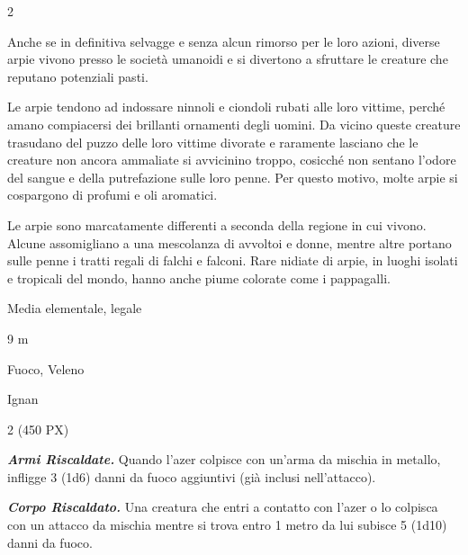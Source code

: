 \begin{multicols}{2}
{Anche se in definitiva selvagge e senza alcun rimorso per le loro azioni, diverse arpie vivono presso le società umanoidi e si divertono a sfruttare le creature che reputano potenziali pasti.

Le arpie tendono ad indossare ninnoli e ciondoli rubati alle loro vittime, perché amano compiacersi dei brillanti ornamenti degli uomini. Da vicino queste creature trasudano del puzzo delle loro vittime divorate e raramente lasciano che le creature non ancora ammaliate si avvicinino troppo, cosicché non sentano l'odore del sangue e della putrefazione sulle loro penne. Per questo motivo, molte arpie si cospargono di profumi e oli aromatici.

Le arpie sono marcatamente differenti a seconda della regione in cui vivono. Alcune assomigliano a una mescolanza di avvoltoi e donne, mentre altre portano sulle penne i tratti regali di falchi e falconi. Rare nidiate di arpie, in luoghi isolati e tropicali del mondo, hanno anche piume colorate come i pappagalli.

\begin{description}[noitemsep, topsep=0pt, parsep=0pt, partopsep=0pt, itemsep=1pt, leftmargin=2.35cm,  labelwidth=2.2cm, itemindent=0cm, listparindent=0pt] %
\setlength{\baselineskip}{10pt}
\item[\textbf{Taglia/Tipo}] Media elementale, legale
\item[\textbf{Caratt.}] 
\item[\textbf{Punti Ferita}] 
\item[\textbf{Movimento}] 9 m
\item[\textbf{Tiri Salvez.}] 
\item[\textbf{Imm. Danni}] Fuoco, Veleno
\item[\textbf{Linguaggi}] Ignan
\item[\textbf{Sfida}] 2 (450 PX)
\end{description}
\smallskip

\emph{\textbf{Armi Riscaldate.}} Quando l'azer colpisce con un'arma da mischia in metallo, infligge 3 (1d6) danni da fuoco aggiuntivi (già inclusi nell'attacco).

\emph{\textbf{Corpo Riscaldato.}} Una creatura che entri a contatto con l'azer o lo colpisca con un attacco da mischia mentre si trova entro 1 metro da lui subisce 5 (1d10) danni da fuoco.

}
\end{multicols}
